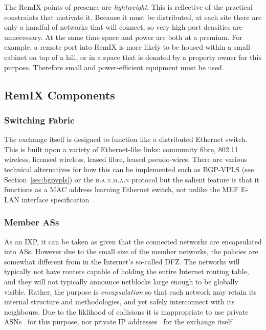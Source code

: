 The RemIX points of presence are \emph{lightweight}. This is
reflective of the practical constraints that motivate it. Because it
must be distributed, at each site there are only a handful of networks
that will connect, so very high port densities are unnecessary. At the
same time space and power are both at a premium. For example, a remote
port into RemIX is more likely to be housed within a small cabinet on
top of a hill, or in a space that is donated by a property owner for
this purpose. Therefore small and power-efficient equipment must be
used.

\subsection{RemIX Components}

\subsubsection{Switching Fabric}
The exchange itself is designed to function like a distributed
Ethernet switch. This is built upon a variety of
Ethernet-like links: community fibre, 802.11 wireless, licensed
wireless, leased fibre, leased pseudo-wires.  There are various
technical alternatives for how this can be implemented such as
BGP-VPLS (see Section~\ref{sec:bgpvpls}) or the \textsc{b.a.t.m.a.n}
protocol but the salient feature is that it functions as a MAC address
learning Ethernet switch, not unlike the \ac{MEF} E-LAN interface
specification~\cite{mef62,mefes}.

\subsubsection{Member \acp{AS}}
As an \ac{IXP}, it can be taken as given that the connected networks
are encapsulated into \acp{AS}. However due to the small size of the
member networks, the policies are somewhat different from in the
Internet's so-called \ac{DFZ}. The networks will typically not have
routers capable of holding the entire Internet routing table, and they
will not typically announce netblocks large enough to be globally
visible. Rather, the purpose is \emph{encapsulation} so that each
network may retain its internal structure and methodologies, and yet
safely interconnect with its neighbours. Due to the
liklihood of collisions it is inappropriate to use private
\acp{ASN}~\cite{rfc6996} for this purpose, nor private IP 
addresses~\cite{rfc1918} for the exchange itself.

